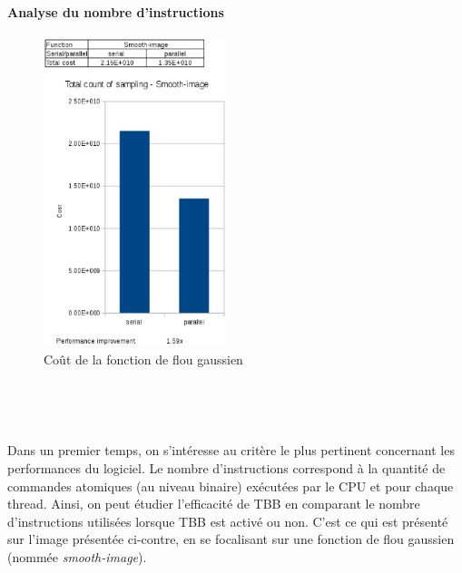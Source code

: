 \documentclass[10pt]{report}
\begin{document}
		
	
		
		
	
		
		\paragraph{Analyse du nombre d'instructions}
		
		\begin{figure}
			\includegraphics[height=9cm]{Reports/figures/smooth_image_costs.eps}
			\caption{Coût de la fonction de flou gaussien}
			\label{Coût de la fonction de flou gaussien}
		\end{figure}
		~\par~\par
		Dans un premier temps, on s'intéresse au critère le plus pertinent concernant les performances du logiciel. Le nombre d'instructions correspond à la quantité de commandes atomiques (au niveau binaire) exécutées par le CPU et pour chaque thread.
		Ainsi, on peut étudier l'efficacité de TBB en comparant le nombre d'instructions utilisées lorsque TBB est activé ou non. C'est ce qui est présenté sur l'image présentée ci-contre, en se focalisant sur une fonction de flou gaussien (nommée \textit{smooth-image}).\\
\end{document}
